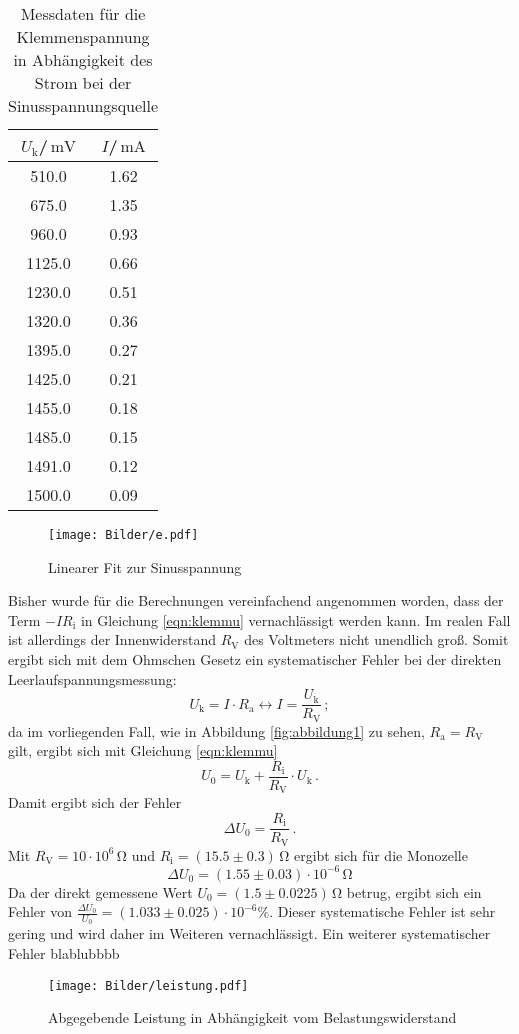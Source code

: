 \begin{table}
  \centering
  \caption{Messdaten für die Klemmenspannung in Abhängigkeit des Strom bei der Sinusspannungsquelle}
  \label{tab:sinus}

\begin{tabular}{cc}
  \toprule
$U_\text{k}$/$\,\si{\milli\volt}$ & $I$/$\,\si{\milli\ampere}$\\
\midrule
510.0 & 1.62 \\
675.0 & 1.35 \\
960.0 & 0.93 \\
1125.0 & 0.66 \\
1230.0 & 0.51 \\
1320.0 & 0.36 \\
1395.0 & 0.27 \\
1425.0 & 0.21 \\
1455.0 & 0.18 \\
1485.0 & 0.15 \\
1491.0 & 0.12 \\
1500.0 & 0.09 \\
\bottomrule
\end{tabular}
\end{table}
\begin{figure}
\texttt{[image: Bilder/e.pdf]}
\caption{Linearer Fit zur Sinusspannung}
\label{fig:plot_sinus}
\end{figure}
Bisher wurde für die Berechnungen vereinfachend angenommen worden,
dass der Term $-IR_\text{i}$ in Gleichung \eqref{eqn:klemmu} vernachlässigt werden kann. Im realen Fall ist allerdings der Innenwiderstand $R_\text{V}$ des Voltmeters nicht unendlich groß.
Somit ergibt sich mit dem Ohmschen Gesetz ein systematischer Fehler bei der direkten Leerlaufspannungsmessung:
\begin{equation*}
  U_\text{k}=I\cdot R_\text{a} \leftrightarrow I=\frac{U_\text{k}}{R_\text{V}}\, ;
\end{equation*}
da im vorliegenden Fall, wie in Abbildung \ref{fig:abbildung1} zu sehen, $R_\text{a}=R_\text{V}$ gilt, ergibt sich mit Gleichung \eqref{eqn:klemmu}
\begin{equation*}
U_\text{0}=U_\text{k}+\frac{R_\text{i}}{R_\text{V}}\cdot U_\text{k}\, .
\end{equation*}
Damit ergibt sich der Fehler
\begin{equation*}
  \Delta  U_\text{0}=\frac{R_\text{i}}{R_\text{V}} \, .
\end{equation*}
Mit $R_\text{V}=10 \cdot 10^6 \,\si{\ohm}$ und $R_\text{i}=(15.5\pm0.3)\,\si{\ohm}$ ergibt sich für die Monozelle
\begin{equation*}
\Delta U_\text{0}= (1.55 \pm 0.03)\cdot 10^{-6}\, \si{\ohm}
\end{equation*}
Da der direkt gemessene Wert $U_\text{0}=(1.5 \pm 0.0225)\, \si{\ohm}$ betrug, ergibt sich ein Fehler von $\frac{\Delta U_\text{0}}{U_\text{0}}=(1.033\pm0.025)\cdot 10^{-6} \%$.
Dieser systematische Fehler ist sehr gering und wird daher im Weiteren vernachlässigt.
Ein weiterer systematischer Fehler blablubbbb%

\begin{figure}
\texttt{[image: Bilder/leistung.pdf]}
\caption{Abgegebende Leistung in Abhängigkeit vom Belastungswiderstand}
\label{fig:aufe}
\end{figure}


